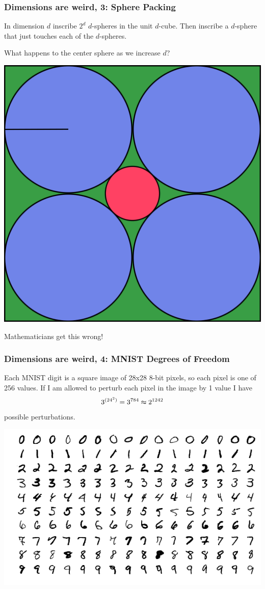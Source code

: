 \documentclass{beamer}
\begin{document}
\begin{frame}
    \frametitle{Dimensions are weird, 3: Sphere Packing}
    In dimension $d$ inscribe $2^d$ $d$-spheres in the unit $d$-cube. Then inscribe a $d$-sphere that just touches each of the $d$-spheres.

    What happens to the center sphere as we increase $d$?
    \begin{center}
    \includegraphics[scale=0.7]{sphere_illustration.png}

    Mathematicians get this wrong!
    \end{center}
\end{frame}

\begin{frame}
    \frametitle{Dimensions are weird, 4: MNIST Degrees of Freedom}
    Each MNIST digit is a square image of 28x28 8-bit pixels, so each pixel is one of 256 values. If I am allowed to perturb each pixel in the image by 1 value I have $$3^{(24^2)}=3^{784} \thickapprox 2^{1242}$$ possible perturbations.
    \begin{center}
    \includegraphics[scale=0.42]{MnistExamples.png}
    \end{center}
\end{frame}
\end{document}
